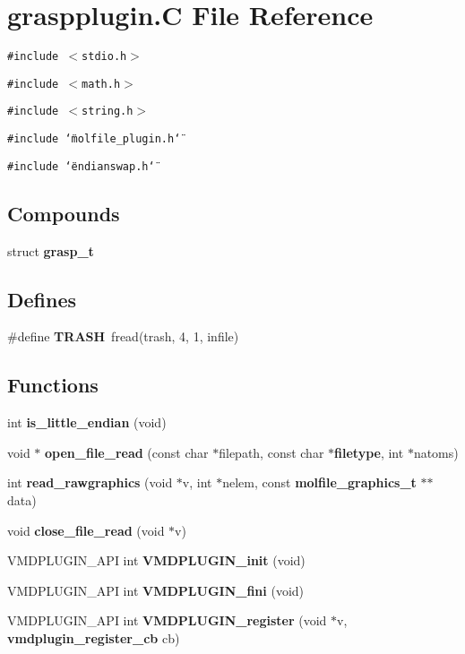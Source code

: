 \section{graspplugin.C File Reference}
\label{graspplugin_8C}
{\tt \#include $<$stdio.h$>$}\par
{\tt \#include $<$math.h$>$}\par
{\tt \#include $<$string.h$>$}\par
{\tt \#include \char`\"{}molfile\_\-plugin.h\char`\"{}}\par
{\tt \#include \char`\"{}endianswap.h\char`\"{}}\par
\subsection*{Compounds}
\begin{CompactItemize}
\item 
struct {\bf grasp\_\-t}
\end{CompactItemize}
\subsection*{Defines}
\begin{CompactItemize}
\item 
\#define {\bf TRASH}\ fread(trash, 4, 1, infile)
\end{CompactItemize}
\subsection*{Functions}
\begin{CompactItemize}
\item 
int {\bf is\_\-little\_\-endian} (void)
\item 
void $\ast$ {\bf open\_\-file\_\-read} (const char $\ast$filepath, const char $\ast${\bf filetype}, int $\ast$natoms)
\item 
int {\bf read\_\-rawgraphics} (void $\ast$v, int $\ast$nelem, const {\bf molfile\_\-graphics\_\-t} $\ast$$\ast$data)
\item 
void {\bf close\_\-file\_\-read} (void $\ast$v)
\item 
VMDPLUGIN\_\-API int {\bf VMDPLUGIN\_\-init} (void)
\item 
VMDPLUGIN\_\-API int {\bf VMDPLUGIN\_\-fini} (void)
\item 
VMDPLUGIN\_\-API int {\bf VMDPLUGIN\_\-register} (void $\ast$v, {\bf vmdplugin\_\-register\_\-cb} cb)
\end{CompactItemize}
